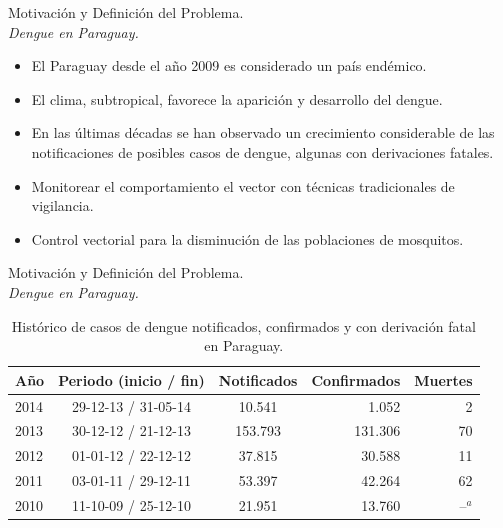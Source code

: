 \begin{frame}[t]{Motivación y Definición del Problema.\\\textit{Dengue en Paraguay.}}
  \begin{center}
    \begin{itemize}
    \item El Paraguay desde el año 2009 es considerado un país endémico.

    \item El clima, subtropical, favorece la aparición y desarrollo del dengue.

    \item En las últimas décadas se han observado un crecimiento considerable de las notificaciones de posibles casos de dengue, algunas con derivaciones fatales.

    \item Monitorear el comportamiento el vector con técnicas tradicionales de vigilancia.

    \item Control vectorial para la disminución de las poblaciones de mosquitos.
    \end{itemize}
  \end{center}
\end{frame}


\begin{frame}[t]{Motivación y Definición del Problema.\\\textit{Dengue en Paraguay.}}
  \begin{center}
  \begin{table}
      \begin{minipage}{\textwidth}
          \begin{center}
          \caption{Histórico de casos de dengue notificados, confirmados y con derivación fatal en Paraguay.}
          \begin{tabular}{l c c r r}
              \hline
              Año & Periodo (inicio / fin) & Notificados & Confirmados & Muertes\\
              \hline
              \hline
              2014 & 29-12-13 / 31-05-14 & 10.541 & 1.052 & 2\\
              2013 & 30-12-12 / 21-12-13 & 153.793 & 131.306 & 70\\
              2012 & 01-01-12 / 22-12-12 & 37.815 & 30.588 & 11\\
              2011 & 03-01-11 / 29-12-11 & 53.397 & 42.264 & 62\\
              2010 & 11-10-09 / 25-12-10 & 21.951 & 13.760 & --$^a$
          \end{tabular}
          \end{center}
      \end{minipage}
  \end{table}
  \end{center}
\end{frame}

